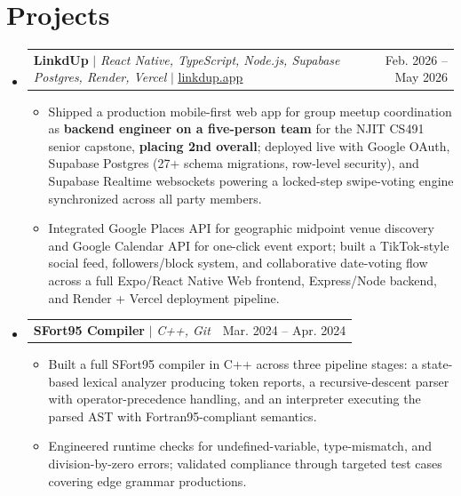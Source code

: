 \documentclass[letterpaper,10pt]{article}
\makeatletter
\newcommand{\resumeItem}[1]{\item\small{{#1 \vspace{-2pt}}}}
\newcommand{\resumeProjectHeading}[2]{
    \item
    \begin{tabular*}{0.97\textwidth}{l@{\extracolsep{\fill}}r}
      \small#1 & #2 \\
    \end{tabular*}\vspace{-7pt}
}
\newcommand{\resumeSubHeadingListStart}{\begin{itemize}[leftmargin=0.15in, label={}]}
\newcommand{\resumeSubHeadingListEnd}{\end{itemize}}
\newcommand{\resumeItemListStart}{\begin{itemize}[itemsep=0pt, parsep=1pt, topsep=2pt]}
\newcommand{\resumeItemListEnd}{\end{itemize}\vspace{-5pt}}
\makeatother
\begin{document}
\section{Projects}
    \resumeSubHeadingListStart
      \resumeProjectHeading
          {\textbf{LinkdUp} $|$ \emph{React Native, TypeScript, Node.js, Supabase Postgres, Render, Vercel} $|$ \href{https://linkdup.app}{\underline{linkdup.app}}}{Feb. 2026 -- May 2026}
          \resumeItemListStart
            \resumeItem{Shipped a production mobile-first web app for group meetup coordination as \textbf{backend engineer on a five-person team} for the NJIT CS491 senior capstone, \textbf{placing 2nd overall}; deployed live with Google OAuth, Supabase Postgres (27+ schema migrations, row-level security), and Supabase Realtime websockets powering a locked-step swipe-voting engine synchronized across all party members.}
            \resumeItem{Integrated Google Places API for geographic midpoint venue discovery and Google Calendar API for one-click event export; built a TikTok-style social feed, followers/block system, and collaborative date-voting flow across a full Expo/React Native Web frontend, Express/Node backend, and Render + Vercel deployment pipeline.}
          \resumeItemListEnd

      \resumeProjectHeading
          {\textbf{SFort95 Compiler} $|$ \emph{C++, Git}}{Mar. 2024 -- Apr. 2024}
          \resumeItemListStart
            \resumeItem{Built a full SFort95 compiler in C++ across three pipeline stages: a state-based lexical analyzer producing token reports, a recursive-descent parser with operator-precedence handling, and an interpreter executing the parsed AST with Fortran95-compliant semantics.}
            \resumeItem{Engineered runtime checks for undefined-variable, type-mismatch, and division-by-zero errors; validated compliance through targeted test cases covering edge grammar productions.}
          \resumeItemListEnd
    \resumeSubHeadingListEnd

\end{document}
